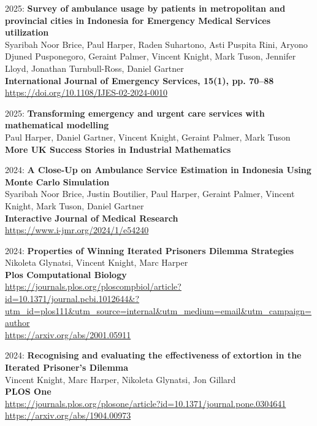 \documentclass[10pt]{article}
\begin{document}
\begin{etaremune}
\item
  2025: \textbf{Survey of ambulance usage by patients in metropolitan and provincial cities in Indonesia for Emergency Medical Services utilization}\\
  Syaribah Noor Brice, Paul Harper, Raden Suhartono, Asti Puspita Rini, Aryono Djuned Pusponegoro, Geraint Palmer, Vincent Knight, Mark Tuson, Jennifer Lloyd, Jonathan Turnbull-Ross, Daniel Gartner\\
  \textbf{International Journal of Emergency Services, 15(1), pp. 70--88}\\
  \url{https://doi.org/10.1108/IJES-02-2024-0010}\\
  

\item
  2025: \textbf{Transforming emergency and urgent care services with mathematical modelling}\\
  Paul Harper, Daniel Gartner, Vincent Knight, Geraint Palmer, Mark Tuson\\
  \textbf{More UK Success Stories in Industrial Mathematics}\\
  
  

\item
  2024: \textbf{A Close-Up on Ambulance Service Estimation in Indonesia Using Monte Carlo Simulation}\\
  Syaribah Noor Brice, Justin Boutilier, Paul Harper, Geraint Palmer, Vincent Knight, Mark Tuson, Daniel Gartner\\
  \textbf{Interactive Journal of Medical Research}\\
  \url{https://www.i-jmr.org/2024/1/e54240}\\
  

\item
  2024: \textbf{Properties of Winning Iterated Prisoners Dilemma Strategies}\\
  Nikoleta Glynatsi, Vincent Knight, Marc Harper\\
  \textbf{Plos Computational Biology}\\
  \url{https://journals.plos.org/ploscompbiol/article?id=10.1371/journal.pcbi.1012644&?utm_id=plos111&utm_source=internal&utm_medium=email&utm_campaign=author}\\
  \url{https://arxiv.org/abs/2001.05911}\\

\item
  2024: \textbf{Recognising and evaluating the effectiveness of extortion in the Iterated Prisoner's Dilemma}\\
  Vincent Knight, Marc Harper, Nikoleta Glynatsi, Jon Gillard\\
  \textbf{PLOS One}\\
  \url{https://journals.plos.org/plosone/article?id=10.1371/journal.pone.0304641}\\
  \url{https://arxiv.org/abs/1904.00973}\\


\end{etaremune}
\end{document}
